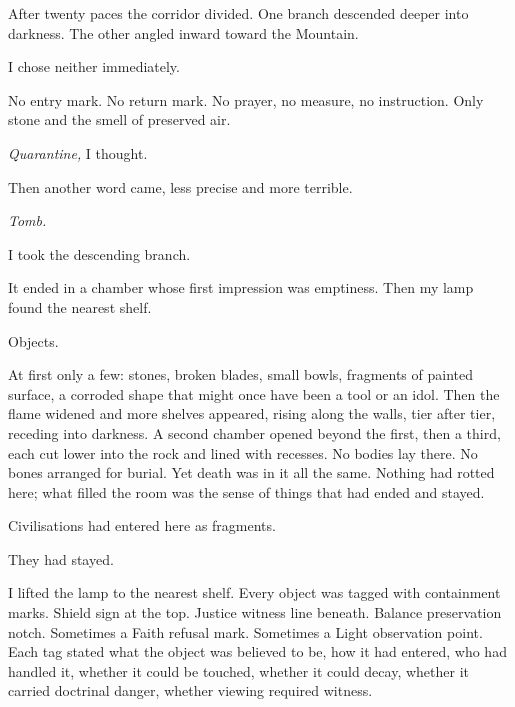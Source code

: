 After twenty paces the corridor divided. One branch descended deeper into darkness. The other angled inward toward the Mountain.\par

I chose neither immediately.\par

No entry mark. No return mark. No prayer, no measure, no instruction. Only stone and the smell of preserved air.\par

\textit{Quarantine,} I thought.\par

Then another word came, less precise and more terrible.\par

\textit{Tomb.}\par

I took the descending branch.\par

It ended in a chamber whose first impression was emptiness. Then my lamp found the nearest shelf.\par

Objects.\par

At first only a few: stones, broken blades, small bowls, fragments of painted surface, a corroded shape that might once have been a tool or an idol. Then the flame widened and more shelves appeared, rising along the walls, tier after tier, receding into darkness. A second chamber opened beyond the first, then a third, each cut lower into the rock and lined with recesses. No bodies lay there. No bones arranged for burial. Yet death was in it all the same. Nothing had rotted here; what filled the room was the sense of things that had ended and stayed.\par

Civilisations had entered here as fragments.\par

They had stayed.\par

I lifted the lamp to the nearest shelf. Every object was tagged with containment marks. Shield sign at the top. Justice witness line beneath. Balance preservation notch. Sometimes a Faith refusal mark. Sometimes a Light observation point. Each tag stated what the object was believed to be, how it had entered, who had handled it, whether it could be touched, whether it could decay, whether it carried doctrinal danger, whether viewing required witness.\par

